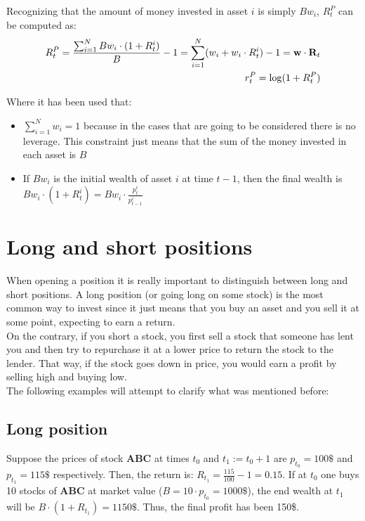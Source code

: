 Recognizing that the amount of money invested in asset $i$ is simply 
$B w_i$, $R_t^P$ can be computed as:
\begin{align*}
	R_t^P = \frac{\sum_{i = 1}^{N} B w_i \cdot (1 + R_{t}^{i})}{B} - 1 =
	\sum_{i = 1}^{N} (w_i + w_i \cdot R_{t}^{i}) - 1 =
	\textbf{w} \cdot \textbf{R}_{t}\\
	r_t^P = \log (1 + R_t^P)\hfill
\end{align*}

Where it has been used that:
\begin{itemize}
	\item $\sum_{i=1}^N w_i = 1$ because in the cases that are going to be 
	considered there is no leverage. This constraint just means that the sum 
	of the money invested in each asset is $B$
	
	\item If $B w_i$ is the initial wealth of asset $i$ at time $t-1$, then 
	the final wealth is $B w_i \cdot (1 + R_t^i) = B w_i \cdot 
	\frac{p_t^i}{p_{t-1}^{i}}$
\end{itemize}

\section{Long and short positions}
When opening a position it is really important to distinguish between long
and short positions. A long position (or going long on some stock) is the 
most common way to invest since it just means that you buy an asset and you 
sell it at some point, expecting to earn a return.\\

On the contrary, if you short a stock, you first sell a stock that someone 
has lent you and then try to repurchase it at a lower price to return the 
stock to the lender. That way, if the stock goes down in price, you would 
earn a profit by selling high and buying low.\\

The following examples will attempt to clarify what was mentioned before:
\subsection*{Long position}
Suppose the prices of stock \textbf{ABC} at times $t_0$ and $t_1 := t_0 + 1$ 
are $p_{t_0} = 100\$ $ and $p_{t_1} = 115\$ $ respectively. Then, the return 
is: $R_{t_1} = \frac{115}{100} - 1 = 0.15$. If at $t_0$ one buys 10 stocks 
of \textbf{ABC} at market value ($B = 10 \cdot p_{t_0} = 1000\$ $), the end 
wealth at $t_1$ will be $B \cdot (1 + R_{t_1}) = 1150\$ $. Thus, the final 
profit has been 150\$.\\

